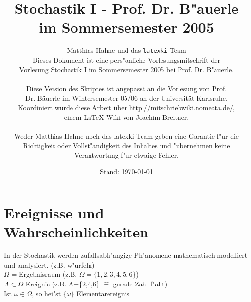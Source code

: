 \documentclass[a4paper,11pt]{book}
\title{Stochastik I - Prof. Dr. B"auerle\\
		im Sommersemester 2005}
\author{Matthias Hahne und das \texttt{latexki}-Team\\[8 cm]
Dieses Dokument ist eine pers"onliche Vorlesungsmitschrift der \\
Vorlesung Stochastik I im Sommersemester 2005 bei Prof. Dr. B"auerle. \\
\\
Diese Version des Skriptes ist angepasst an die Vorlesung von Prof.\\
Dr. Bäuerle im Wintersemester 05/06 an der Universität Karlsruhe.\\
Koordiniert wurde diese Arbeit über \url{http://mitschriebwiki.nomeata.de/},\\
einem \LaTeX-Wiki von Joachim Breitner.\\
\\
Weder Matthias Hahne noch das latexki-Team geben eine Garantie f"ur die \\
Richtigkeit oder Vollst"andigkeit des Inhaltes und "ubernehmen keine\\
Verantwortung f"ur etwaige Fehler.
}
\date{Stand: \today}
\theoremstyle{nonumberplain}
\begin{document}
\thispagestyle{empty}
\maketitle
\newpage
\thispagestyle{empty}
\tableofcontents
\thispagestyle{empty}

\chapter{Ereignisse und Wahrscheinlichkeiten}
\setcounter{page}{1}
In der Stochastik werden zufallsabh"angige Ph"anomene mathematisch modelliert und analysiert. (z.B. w"urfeln)\\
$\Omega$ = Ergebnisraum (z.B. $\Omega = \{1,2,3,4,5,6\}$)\\
$A\subset \Omega$ Ereignis (z.B. A=\{2,4,6\} $\hat{=}$  gerade Zahl f"allt)\\
Ist $\omega \in \Omega$, so hei"st $\{\omega\}$ Elementarereignis
\end{document}

